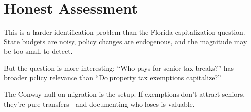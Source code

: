 \documentclass[11pt]{article}
\begin{document}
\section{Honest Assessment}

This is a harder identification problem than the Florida capitalization question. State budgets are noisy, policy changes are endogenous, and the magnitude may be too small to detect.

But the question is more interesting: ``Who pays for senior tax breaks?'' has broader policy relevance than ``Do property tax exemptions capitalize?''

The Conway null on migration is the setup. If exemptions don't attract seniors, they're pure transfers---and documenting who loses is valuable.
\end{document}
